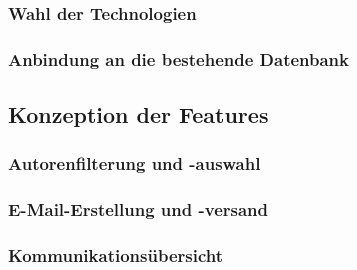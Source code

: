 \documentclass[11pt,a4paper]{article}
\begin{document}
\subsubsection{Wahl der Technologien}

\subsubsection{Anbindung an die bestehende Datenbank}

\subsection{Konzeption der Features}

\subsubsection{Autorenfilterung und -auswahl}

\subsubsection{E-Mail-Erstellung und -versand}

\subsubsection{Kommunikationsübersicht}
\end{document}
